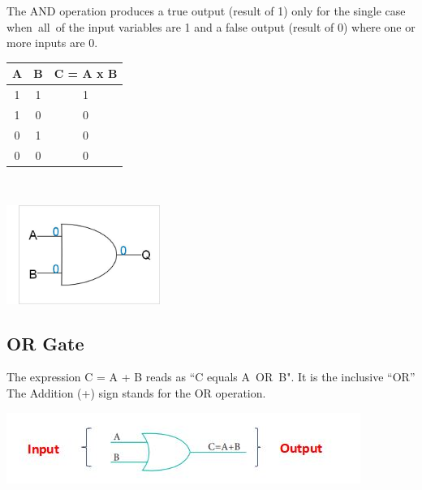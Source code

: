 \documentclass[10pt,a4paper,onecolumn]{article}
\begin{document}
The AND operation produces a true output (result of 1) only for the single case when all of the input variables are 1 and a false output (result of 0) where one or more inputs are 0. \\
\begin{table}[h!]
	\begin{center}
		\begin{tabular}{c|c|c}
			\textbf{A} & \textbf{B} &
			\textbf{C = A x B}\\
			\hline
			1 & 1 & 1\\
			\hline
			1 & 0 & 0\\
			\hline
			0 & 1 & 0\\
			\hline
			0 & 0 & 0\\
			\hline
		\end{tabular}
	\end{center}
\end{table} \\
\begin{center}\includegraphics[width=5cm]{gst6}\end{center} 

\subsection{OR Gate}
The expression C = A + B reads as “C equals A OR B". It is the inclusive “OR”
The Addition (+) sign stands for the OR operation. \\
\begin{center}\includegraphics{gst7}\end{center}
\end{document}
